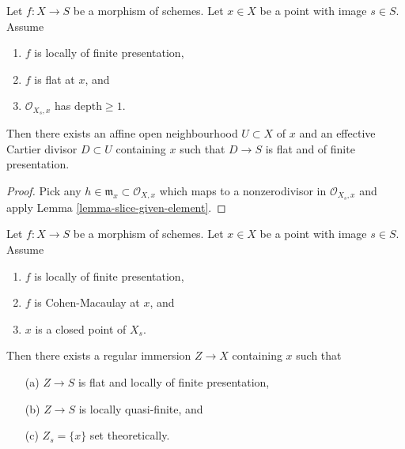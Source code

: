 \begin{lemma}
\label{lemma-slice-once}
Let $f : X \to S$ be a morphism of schemes.
Let $x \in X$ be a point with image $s \in S$.
Assume
\begin{enumerate}
\item $f$ is locally of finite presentation,
\item $f$ is flat at $x$, and
\item $\mathcal{O}_{X_s, x}$ has $\text{depth} \geq 1$.
\end{enumerate}
Then there exists an affine open neighbourhood $U \subset X$ of $x$
and an effective Cartier divisor $D \subset U$ containing $x$ such that
$D \to S$ is flat and of finite presentation.
\end{lemma}

\begin{proof}
Pick any $h \in \mathfrak m_x \subset \mathcal{O}_{X, x}$ which
maps to a nonzerodivisor in $\mathcal{O}_{X_s, x}$ and apply
Lemma \ref{lemma-slice-given-element}.
\end{proof}

\begin{lemma}
\label{lemma-slice-CM}
\begin{reference}
\cite[IV Proposition 17.16.1]{EGA}
\end{reference}
Let $f : X \to S$ be a morphism of schemes.
Let $x \in X$ be a point with image $s \in S$.
Assume
\begin{enumerate}
\item $f$ is locally of finite presentation,
\item $f$ is Cohen-Macaulay at $x$, and
\item $x$ is a closed point of $X_s$.
\end{enumerate}
Then there exists a regular immersion $Z \to X$ containing $x$ such that
\begin{enumerate}
\item[(a)] $Z \to S$ is flat and locally of finite presentation,
\item[(b)] $Z \to S$ is locally quasi-finite, and
\item[(c)] $Z_s = \{x\}$ set theoretically.
\end{enumerate}
\end{lemma}

